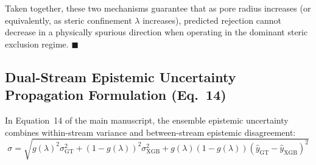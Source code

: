 \documentclass[11pt]{article}
\begin{document}
Taken together, these two mechanisms guarantee that as pore radius increases (or equivalently, as steric confinement $\lambda$ increases), predicted rejection cannot decrease in a physically spurious direction when operating in the dominant steric exclusion regime. $\blacksquare$

\subsection{Dual-Stream Epistemic Uncertainty Propagation Formulation (Eq.~14)}
\label{sec:mixture_and_uq_derivation}

In Equation~14 of the main manuscript, the ensemble epistemic uncertainty combines within-stream variance and between-stream epistemic disagreement:
\begin{equation}
\sigma = \sqrt{g(\lambda)^2 \sigma_{\mathrm{GT}}^2 + \left(1 - g(\lambda)\right)^2 \sigma_{\mathrm{XGB}}^2 + g(\lambda)\left(1 - g(\lambda)\right)\left(\hat{y}_{\mathrm{GT}} - \hat{y}_{\mathrm{XGB}}\right)^2}
\label{eq:s_uq_propagation}
\end{equation}
\end{document}

